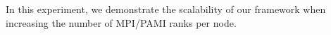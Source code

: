In this experiment, we demonstrate the scalability of our framework when increasing the number of MPI/PAMI ranks per node.
